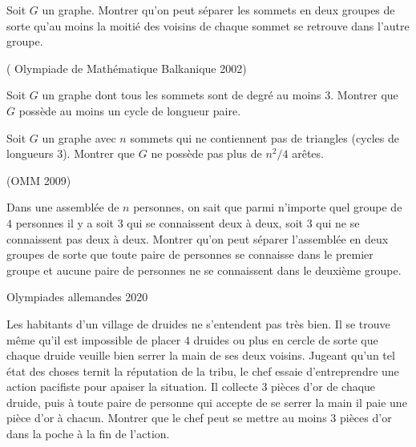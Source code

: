 \begin{exo}

Soit $G$ un graphe. Montrer qu’on peut séparer les sommets en deux groupes de sorte qu’au moins la moitié des voisins de chaque sommet se retrouve dans l’autre groupe.
\end{exo}


\begin{exo}

 ( Olympiade de Mathématique Balkanique 2002)

Soit $G$ un graphe dont tous les sommets sont de degré au moins $3$. Montrer que $G$ possède au moins un cycle de longueur paire.

\end{exo}



\begin{exo}

Soit $G$ un graphe avec $n$ sommets qui ne contiennent pas de triangles (cycles de longueurs $3$). Montrer que $G$ ne possède pas plus de $n^2/4$ arêtes.

\end{exo}


\begin{exo}
(OMM 2009) 


Dans une assemblée de $n$ personnes, on sait que parmi n’importe quel groupe de $4$ personnes il y a soit $3$ qui se connaissent deux à deux, soit $3$ qui ne se connaissent pas deux à deux. Montrer qu’on peut séparer l’assemblée en deux groupes de sorte que toute paire de personnes se connaisse dans le premier groupe et aucune paire de personnes ne se connaissent dans le deuxième groupe.

\end{exo}


\begin{exo}
Olympiades allemandes 2020

Les habitants d’un village de druides ne s'entendent pas très bien. Il se trouve même qu'il est impossible de placer $4$ druides ou plus en cercle de sorte que chaque druide veuille bien serrer la main de ses deux voisins. Jugeant qu’un tel état des choses ternit la réputation de la tribu, le chef essaie d’entreprendre une action pacifiste pour apaiser la situation. Il collecte 3 pièces d’or de chaque druide, puis à toute paire de personne qui accepte de se serrer la main il paie une pièce d’or à chacun. Montrer que le chef peut se mettre au moins 3 pièces d’or dans la poche à la fin de l’action.

\end{exo}

